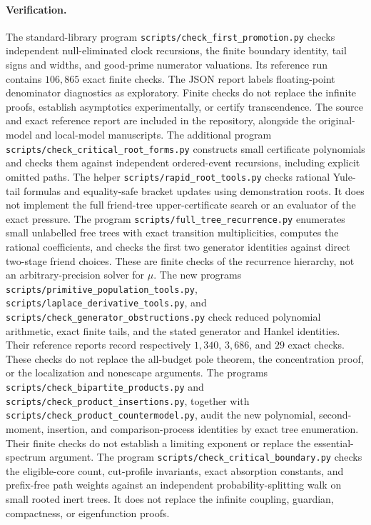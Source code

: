 \documentclass[11pt]{article}
\theoremstyle{remark}
\begin{document}
\paragraph{Verification.}
The standard-library program \texttt{scripts/check\_first\_promotion.py}
checks independent null-eliminated clock recursions, the finite boundary
identity, tail signs and widths, and good-prime numerator valuations.
Its reference run contains $106{,}865$ exact finite checks.
The JSON report labels floating-point denominator diagnostics as
exploratory. Finite checks do not replace the infinite proofs, establish
asymptotics experimentally, or certify transcendence. The source and exact
reference report are included in the repository, alongside the
original-model and local-model manuscripts.
The additional program \texttt{scripts/check\_critical\_root\_forms.py}
constructs small certificate polynomials and checks them against
independent ordered-event recursions, including explicit omitted paths.
The helper \texttt{scripts/rapid\_root\_tools.py} checks rational Yule-tail
formulas and equality-safe bracket updates using demonstration roots.
It does not implement the full friend-tree upper-certificate search or
an evaluator of the exact pressure.
The program \texttt{scripts/full\_tree\_recurrence.py} enumerates small
unlabelled free trees with exact transition multiplicities, computes the
rational coefficients, and checks the first two generator identities
against direct two-stage friend choices. These are finite checks of
the recurrence hierarchy, not an arbitrary-precision solver for $\mu$.
The new programs \texttt{scripts/primitive\_population\_tools.py},
\texttt{scripts/laplace\_derivative\_tools.py}, and
\texttt{scripts/check\_generator\_obstructions.py} check reduced
polynomial arithmetic, exact finite tails, and the stated generator
and Hankel identities. Their reference reports record respectively
$1{,}340$, $3{,}686$, and $29$ exact checks. These checks do not replace
the all-budget pole theorem, the concentration proof, or the
localization and nonescape arguments.
The programs \texttt{scripts/check\_bipartite\_products.py} and
\texttt{scripts/check\_product\_insertions.py}, together with
\texttt{scripts/check\_product\_countermodel.py}, audit the new
polynomial, second-moment, insertion, and comparison-process identities by exact
tree enumeration. Their finite checks do not establish a limiting
exponent or replace the essential-spectrum argument.
The program \texttt{scripts/check\_critical\_boundary.py} checks the
eligible-core count, cut-profile invariants, exact absorption constants,
and prefix-free path weights against an independent probability-splitting
walk on small rooted inert trees. It does not replace the infinite
coupling, guardian, compactness, or eigenfunction proofs.
\end{document}
